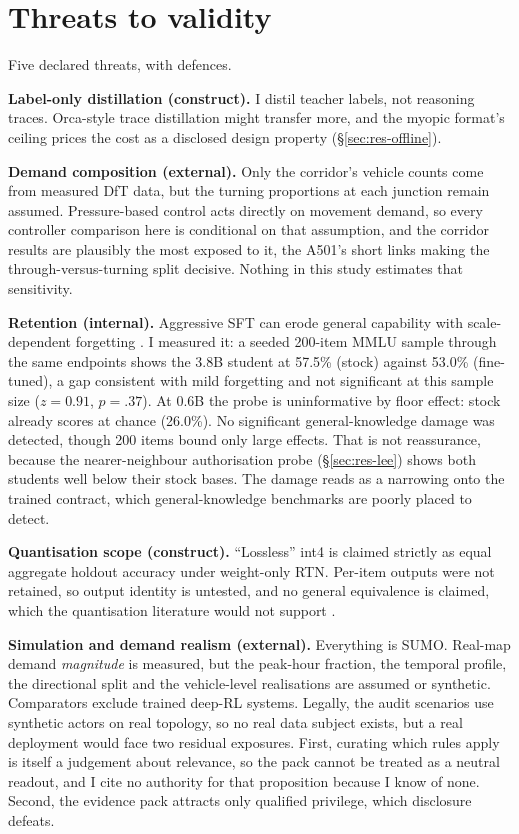 \section{Threats to validity}\label{sec:dis-threats}
Five declared threats, with defences.

\textbf{Label-only distillation (construct).} I distil teacher labels,
not reasoning traces. Orca-style trace distillation
\cite{mukherjee2023orca} might transfer more, and the myopic format's
ceiling prices the cost as a disclosed design property
(\S\ref{sec:res-offline}).

\textbf{Demand composition (external).} Only the corridor's vehicle counts come from
measured DfT data, but the turning proportions at each junction remain
assumed. Pressure-based control acts directly on movement
demand, so every controller comparison here is conditional on that
assumption, and the corridor results are plausibly the most exposed to it,
the A501's short links making the through-versus-turning split decisive.
Nothing in this study estimates that sensitivity.

\textbf{Retention (internal).} Aggressive SFT can erode general
capability with scale-dependent forgetting \cite{forgetting2024}. I
measured it: a seeded 200-item MMLU sample through the same endpoints
shows the 3.8B student at 57.5\% (stock) against 53.0\% (fine-tuned), a
gap consistent with mild forgetting and not significant at this sample
size ($z{=}0.91$, $p{=}.37$). At 0.6B the probe is uninformative by floor effect: stock already
scores at chance (26.0\%). No significant general-knowledge damage was
detected, though 200 items bound only large effects. That is not
reassurance, because the nearer-neighbour authorisation probe
(\S\ref{sec:res-lee}) shows both students well below their stock bases.
The damage reads as a narrowing onto the trained contract, which
general-knowledge benchmarks are poorly placed to detect.

\textbf{Quantisation scope (construct).} ``Lossless'' int4 is claimed
strictly as equal aggregate holdout accuracy under weight-only RTN.
Per-item outputs were not retained, so output identity is untested, and no
general equivalence is claimed, which the quantisation literature would
not support \cite{quantlora2024,frantar2022gptq}.

\textbf{Simulation and demand realism (external).} Everything is SUMO.
Real-map demand \emph{magnitude} is measured, but the peak-hour fraction,
the temporal profile, the directional split and the vehicle-level
realisations are assumed or synthetic. Comparators exclude trained
deep-RL systems. Legally, the audit scenarios use synthetic
actors on real topology, so no real data subject exists, but a real
deployment would face two residual exposures. First, curating which rules
apply is itself a judgement about relevance, so the pack cannot be treated
as a neutral readout, and I cite no authority for that proposition because
I know of none. Second, the evidence pack attracts only qualified
privilege, which disclosure defeats.

